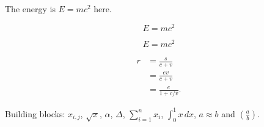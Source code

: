 \documentclass[11pt]{article}
\begin{document}
The energy is $E = mc^2$ here.

\[ E = mc^2 \]

\begin{equation}
  E = mc^2
  \label{eq:energy}
\end{equation}

\begin{align}
  r &= \frac{s}{c + v} \\
    &= \frac{e v}{c + v} \\
    &= \frac{e}{1 + c/v}.
\end{align}

Building blocks: $x_{i,j}$, $\sqrt{x}$, $\alpha$, $\Delta$, $\sum_{i=1}^{n} x_i$,
$\int_0^1 x \, dx$, $a \approx b$ and $\left( \frac{a}{b} \right)$.
\end{document}
